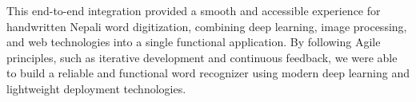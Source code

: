 This end-to-end integration provided a smooth and accessible experience for 
handwritten Nepali word digitization, combining deep learning, image 
processing, and web technologies into a single functional application. By 
following Agile principles, such as iterative development and continuous 
feedback, we were able to build a reliable and functional word recognizer 
using modern deep learning and lightweight deployment technologies.